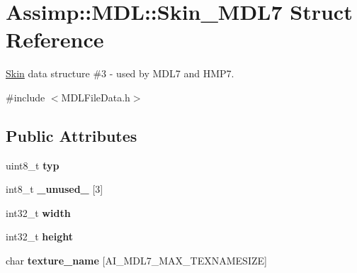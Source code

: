 \hypertarget{struct_assimp_1_1_m_d_l_1_1_skin___m_d_l7}{\section{Assimp\+:\+:M\+D\+L\+:\+:Skin\+\_\+\+M\+D\+L7 Struct Reference}
\label{struct_assimp_1_1_m_d_l_1_1_skin___m_d_l7}
}


\hyperlink{struct_assimp_1_1_m_d_l_1_1_skin}{Skin} data structure \#3 -\/ used by M\+D\+L7 and H\+M\+P7.  




{\ttfamily \#include $<$M\+D\+L\+File\+Data.\+h$>$}

\subsection*{Public Attributes}
\begin{DoxyCompactItemize}
\item 
\hypertarget{struct_assimp_1_1_m_d_l_1_1_skin___m_d_l7_a5428442455cf54d84eec5d2e2aa481d9}{uint8\+\_\+t {\bfseries typ}}\label{struct_assimp_1_1_m_d_l_1_1_skin___m_d_l7_a5428442455cf54d84eec5d2e2aa481d9}

\item 
\hypertarget{struct_assimp_1_1_m_d_l_1_1_skin___m_d_l7_ab81511e16188dc6c4ee8fcb98fc9a613}{int8\+\_\+t {\bfseries \+\_\+unused\+\_\+} \mbox{[}3\mbox{]}}\label{struct_assimp_1_1_m_d_l_1_1_skin___m_d_l7_ab81511e16188dc6c4ee8fcb98fc9a613}

\item 
\hypertarget{struct_assimp_1_1_m_d_l_1_1_skin___m_d_l7_a85203a93c8643d3df30886a37c9c1be9}{int32\+\_\+t {\bfseries width}}\label{struct_assimp_1_1_m_d_l_1_1_skin___m_d_l7_a85203a93c8643d3df30886a37c9c1be9}

\item 
\hypertarget{struct_assimp_1_1_m_d_l_1_1_skin___m_d_l7_a2650efba7d9171e602ead730f1f248d3}{int32\+\_\+t {\bfseries height}}\label{struct_assimp_1_1_m_d_l_1_1_skin___m_d_l7_a2650efba7d9171e602ead730f1f248d3}

\item 
\hypertarget{struct_assimp_1_1_m_d_l_1_1_skin___m_d_l7_a8dd23ab41b0aba0d363e6c17cebcd399}{char {\bfseries texture\+\_\+name} \mbox{[}A\+I\+\_\+\+M\+D\+L7\+\_\+\+M\+A\+X\+\_\+\+T\+E\+X\+N\+A\+M\+E\+S\+I\+Z\+E\mbox{]}}\label{struct_assimp_1_1_m_d_l_1_1_skin___m_d_l7_a8dd23ab41b0aba0d363e6c17cebcd399}

\end{DoxyCompactItemize}


